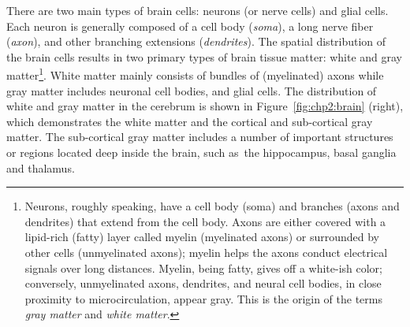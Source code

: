 There are two main types of brain cells: neurons (or nerve cells) and
glial cells. Each neuron is generally composed of a cell body
(\emph{soma}), a long nerve fiber (\emph{axon}), and other
branching extensions (\emph{dendrites}). The spatial distribution
of the brain cells results in two primary types of brain tissue
matter: white and gray matter\footnote{Neurons, roughly speaking, have
  a cell body (soma) and branches (axons and dendrites) that extend
  from the cell body.  Axons are either covered with a lipid-rich
  (fatty) layer called myelin (myelinated axons) or 
  surrounded by other cells (unmyelinated axons); myelin helps the
  axons conduct electrical signals over long distances. Myelin, being
  fatty, gives off a white-ish color; conversely, unmyelinated axons,
  dendrites, and neural cell bodies, in close proximity to
  microcirculation, appear gray.  This is the origin of the terms
  \textit{gray matter} and \textit{white matter}.}. White matter mainly consists of
bundles of (myelinated) axons while gray matter includes neuronal cell
bodies, and glial cells. The distribution of white and gray matter in
the cerebrum is shown in Figure~\ref{fig:chp2:brain} (right), which
demonstrates the white matter and the cortical and sub-cortical gray
matter. The sub-cortical gray matter includes a number of important
structures or regions located deep inside the brain, such as~the
hippocampus, basal ganglia and thalamus.
